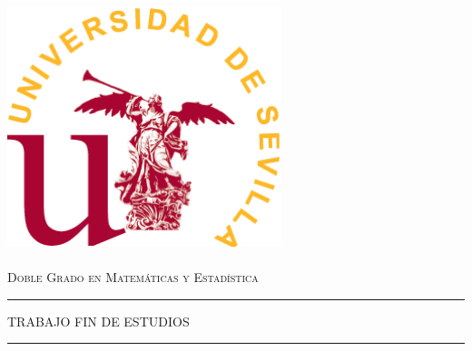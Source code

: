 \documentclass[12pt,a4paper,]{book}
\title{}
\author{}
\date{}
\numberwithin{dummy}{section}
\theoremstyle{ocrenumbox}
\theoremstyle{blacknumex}
\theoremstyle{blacknumbox}
\theoremstyle{ocrenum}
\theoremstyle{ocrenum}
\begin{document}



\begin{titlepage}

\newcommand{\HRule}{\rule{\linewidth}{0.5mm}} %

\center %


\begin{minipage}{14cm}
\center

\includegraphics[width=8cm,height=8cm]{logo}\\[0.5cm] %


\textsc{\LARGE Doble Grado en Matemáticas y Estadística}\\[2.5cm] 



\rule[1.7mm]{2cm}{0.5mm}
\hfill
\textsc{\Large TRABAJO FIN DE ESTUDIOS} 
\hfill
\rule[1.7mm]{2cm}{0.5mm} 
\\[0.75cm]


\end{minipage}
\end{titlepage}
\end{document}
